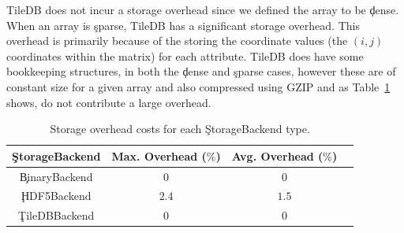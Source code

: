 TileDB does not incur a storage overhead since we defined the array to be
\c{dense}. When an array is \c{sparse}, TileDB has a significant storage
overhead. This overhead is primarily because of the storing the coordinate
values (the $(i,j)$ coordinates within the matrix) for each attribute. TileDB
does have some bookkeeping structures, in both the \c{dense} and \c{sparse}
cases, however these are of constant size for a given array and also compressed
using GZIP and as Table~\ref{table:storage-overhead} shows, do not contribute a
large overhead.

\begin{table}[h!]
\centering
 \begin{tabular}{|c |c |c |c|}
  \hline
  \c{StorageBackend} & Max. Overhead ($\%$) & Avg. Overhead ($\%$) \\
  \hline
  \c{BinaryBackend} & $0$ & $0$ \\
  \hline
  \c{HDF5Backend} & $2.4$ & $1.5$ \\
  \hline
  \c{TileDBBackend} & $0$ & $0$ \\
  \hline
\end{tabular}
\caption{Storage overhead costs for each \c{StorageBackend} type.}
\label{table:storage-overhead}
\end{table}

